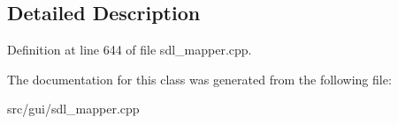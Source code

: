 \subsection{Detailed Description}


Definition at line 644 of file sdl\-\_\-mapper.\-cpp.



The documentation for this class was generated from the following file\-:\begin{DoxyCompactItemize}
\item 
src/gui/sdl\-\_\-mapper.\-cpp\end{DoxyCompactItemize}
